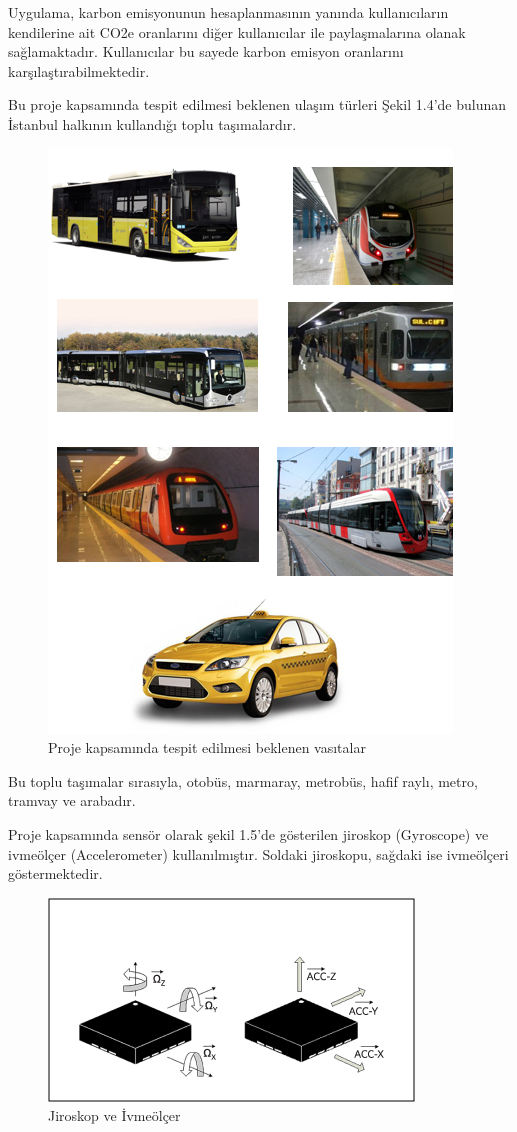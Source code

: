 Uygulama, karbon emisyonunun hesaplanmasının yanında kullanıcıların kendilerine ait CO2e oranlarını diğer kullanıcılar ile paylaşmalarına olanak sağlamaktadır. Kullanıcılar bu sayede karbon emisyon oranlarını karşılaştırabilmektedir.

\newpage
Bu proje kapsamında tespit edilmesi beklenen ulaşım türleri Şekil 1.4'de bulunan İstanbul halkının kullandığı toplu taşımalardır. 

\begin{figure}[!h]
\centering
\includegraphics[scale=0.5]{projectChapters/images/Group.png}
\caption{Proje kapsamında tespit edilmesi beklenen vasıtalar}
\end{figure}

Bu toplu taşımalar sırasıyla, otobüs, marmaray, metrobüs, hafif raylı, metro, tramvay ve arabadır. 

Proje kapsamında sensör olarak  şekil 1.5'de gösterilen jiroskop (Gyroscope) ve ivmeölçer (Accelerometer) kullanılmıştır. Soldaki jiroskopu, sağdaki ise ivmeölçeri göstermektedir.

\begin{figure}[!htbp]
\centering
\includegraphics[scale=0.7]{projectChapters/images/acc_and_gyro.png}
\caption{Jiroskop ve İvmeölçer}
\end{figure}

